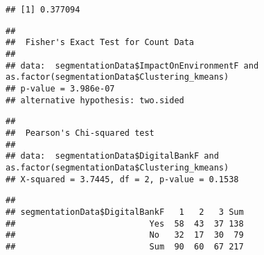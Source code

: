 \documentclass[
]{article}
\newenvironment{Shaded}{\begin{snugshade}}{\end{snugshade}}
\newcommand{\CommentTok}[1]{\textcolor[rgb]{0.56,0.35,0.01}{\textit{#1}}}
\newcommand{\FunctionTok}[1]{\textcolor[rgb]{0.00,0.00,0.00}{#1}}
\newcommand{\NormalTok}[1]{#1}
\newcommand{\OtherTok}[1]{\textcolor[rgb]{0.56,0.35,0.01}{#1}}
\newcommand{\SpecialCharTok}[1]{\textcolor[rgb]{0.00,0.00,0.00}{#1}}
\begin{document}
\begin{verbatim}
## [1] 0.377094
\end{verbatim}

\begin{Shaded}
\end{Shaded}

\begin{verbatim}
## 
##  Fisher's Exact Test for Count Data
## 
## data:  segmentationData$ImpactOnEnvironmentF and as.factor(segmentationData$Clustering_kmeans)
## p-value = 3.986e-07
## alternative hypothesis: two.sided
\end{verbatim}

\begin{Shaded}
\end{Shaded}

\begin{verbatim}
## 
##  Pearson's Chi-squared test
## 
## data:  segmentationData$DigitalBankF and as.factor(segmentationData$Clustering_kmeans)
## X-squared = 3.7445, df = 2, p-value = 0.1538
\end{verbatim}

\begin{Shaded}
\end{Shaded}

\begin{verbatim}
##                              
## segmentationData$DigitalBankF   1   2   3 Sum
##                           Yes  58  43  37 138
##                           No   32  17  30  79
##                           Sum  90  60  67 217
\end{verbatim}
\end{document}
